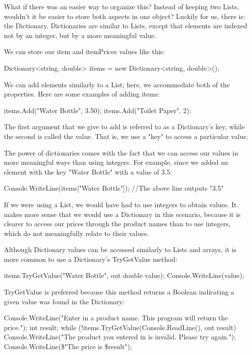 \documentclass[oneside, openany] {book}
\begin{document}
What if there was an easier way to organize this? Instead of keeping two Lists, wouldn't it be easier to store both aspects in one object? Luckily for us, there is: the Dictionary. Dictionaries are similar to Lists, except that elements are indexed not by an integer, but by a more meaningful value.

We can store our item and itemPrices values like this:
\begin{CSharp}
Dictionary<string, double> items = new Dictionary<string, double>();
\end{CSharp}
We can add elements similarly to a List; here, we accommodate both of the properties. Here are some examples of adding items:
\begin{CSharp}
items.Add("Water Bottle", 3.50);
items.Add("Toilet Paper", 2);
\end{CSharp}
The first argument that we give to add is referred to as a Dictionary's key, while the second is called the value. That is, we use a "key" to access a particular value.

The power of dictionaries comes with the fact that we can access our values in more meaningful ways than using integers. For example, since we added an element with the key "Water Bottle" with a value of 3.5:
\begin{CSharp}
Console.WriteLine(items["Water Bottle"]);
//The above line outputs "3.5"
\end{CSharp}
If we were using a List, we would have had to use integers to obtain values. It makes more sense that we would use a Dictionary in this scenario, because it is clearer to access our prices through the product names than to use integers, which do not meaningfully relate to their values.

Although Dictionary values can be accessed similarly to Lists and arrays, it is more common to use a Dictionary's TryGetValue method:
\begin{CSharp}
items.TryGetValue("Water Bottle", out double value);
Console.WriteLine(value);
\end{CSharp}

TryGetValue is preferred because this method returns a Boolean indicating a given value was found in the Dictionary:

\begin{CSharp}
Console.WriteLine("Enter in a product name. This program will return the price.");
int result;
while (!items.TryGetValue(Console.ReadLine(), out result)
{
  Console.WriteLine("The product you entered in is invalid. Please try again.");
}
Console.WriteLine(\$"The price is \${result}");
\end{CSharp}
\end{document}
